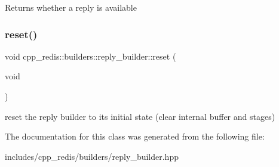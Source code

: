 \begin{DoxyReturn}{Returns}
whether a reply is available 
\end{DoxyReturn}
\mbox{\label{classcpp__redis_1_1builders_1_1reply__builder_a9dc120d8bdbe8992bb113f029a825c45}} 
\subsubsection{\texorpdfstring{reset()}{reset()}}
{\footnotesize\ttfamily void cpp\+\_\+redis\+::builders\+::reply\+\_\+builder\+::reset (\begin{DoxyParamCaption}\item[{void}]{ }\end{DoxyParamCaption})}

reset the reply builder to its initial state (clear internal buffer and stages) 

The documentation for this class was generated from the following file\+:\begin{DoxyCompactItemize}
\item 
includes/cpp\+\_\+redis/builders/reply\+\_\+builder.\+hpp\end{DoxyCompactItemize}
